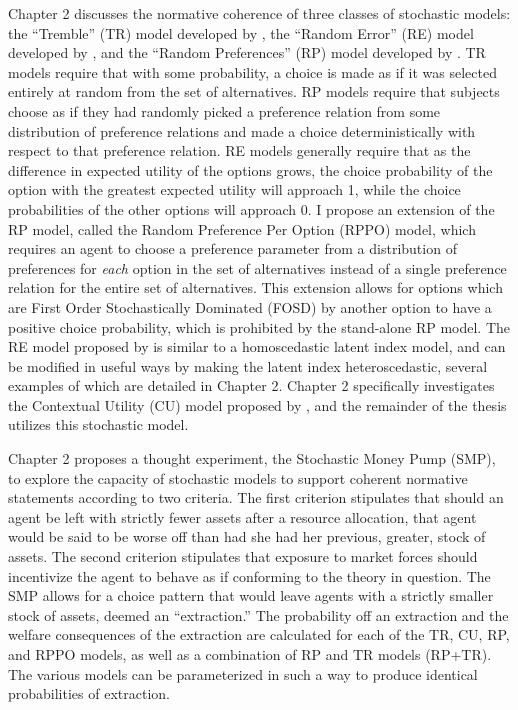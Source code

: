 \documentclass[../main.tex]{subfiles}
\begin{document}
Chapter 2 discusses the normative coherence of three classes of stochastic models: the \enquote{Tremble} (TR) model developed by \textcite{Harless1994}, the \enquote{Random Error} (RE) model developed by \textcite{Hey1994}, and the \enquote{Random Preferences} (RP) model developed by \textcite{Loomes1998}.
TR models require that with some probability, a choice is made as if it was selected entirely at random from the set of alternatives.
RP models require that subjects choose as if they had randomly picked a preference relation from some distribution of preference relations and made a choice deterministically with respect to that preference relation.
RE models generally require that as the difference in expected utility of the options grows, the choice probability of the option with the greatest expected utility will approach 1, while the choice probabilities of the other options will approach 0.{\footnotemark}
I propose an extension of the RP model, called the Random Preference Per Option (RPPO) model, which requires an agent to choose a preference parameter from a distribution of preferences for \textit{each} option in the set of alternatives instead of a single preference relation for the entire set of alternatives.
This extension allows for options which are First Order Stochastically Dominated (FOSD) by another option to have a positive choice probability, which is prohibited by the stand-alone RP model.
The RE model proposed by \textcite{Hey1994} is similar to a homoscedastic latent index model, and can be modified in useful ways by making the latent index heteroscedastic, several examples of which are detailed in Chapter 2.
Chapter 2 specifically investigates the Contextual Utility (CU) model proposed by \textcite{Wilcox2008}, and the remainder of the thesis utilizes this stochastic model.

\addtocounter{footnote}{-1}

Chapter 2 proposes a thought experiment, the Stochastic Money Pump (SMP), to explore the capacity of stochastic models to support coherent normative statements according to two criteria.
The first criterion stipulates that should an agent be left with strictly fewer assets after a resource allocation, that agent would be said to be worse off than had she had her previous, greater, stock of assets.
The second criterion stipulates that exposure to market forces should incentivize the agent to behave as if conforming to the theory in question.
The SMP allows for a choice pattern that would leave agents with a strictly smaller stock of assets, deemed an \enquote{extraction.}
The probability off an extraction and the welfare consequences of the extraction are calculated for each of the TR, CU, RP, and RPPO models, as well as a combination of RP and TR models (RP+TR).
The various models can be parameterized in such a way to produce identical probabilities of extraction.
\end{document}
